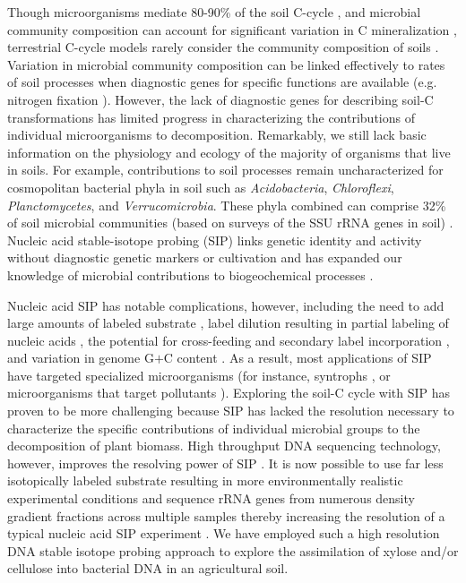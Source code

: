 Though microorganisms mediate 80-90\% of the soil C-cycle
\citep{ColemanCrossley_1996,Nannipieri_2003}, and microbial community
composition can account for significant variation in C mineralization
\citep{Strickland_2009}, terrestrial C-cycle models rarely consider the
community composition of soils \citep{Zak2006,Reed2007}. Variation in microbial
community composition can be linked effectively to rates of soil processes when
diagnostic genes for specific functions are available (e.g. nitrogen fixation
\citep{Hsu2009}).  However, the lack of diagnostic genes for describing soil-C
transformations has limited progress in characterizing the contributions of
individual microorganisms to decomposition. Remarkably, we still lack basic
information on the physiology and ecology of the majority of organisms that
live in soils. For example, contributions to soil processes remain
uncharacterized for cosmopolitan bacterial phyla in soil such as
\textit{Acidobacteria}, \textit{Chloroflexi}, \textit{Planctomycetes}, and
\textit{Verrucomicrobia}. These phyla combined can comprise 32\% of soil
microbial communities (based on surveys of the SSU rRNA genes in soil)
\citep{Janssen2006,Buckley2002}. Nucleic acid stable-isotope probing (SIP)
links genetic identity and activity without diagnostic genetic
markers or cultivation and has expanded our knowledge of microbial contributions to
biogeochemical processes \citep{Chen_Murrell_2010}. 

Nucleic acid SIP has notable complications, however, including the need to add
large amounts of labeled substrate \citep{radajewski2000stable}, label dilution
resulting in partial labeling of nucleic acids \citep{radajewski2000stable},
the potential for cross-feeding and secondary label incorporation
\citep{DeRito2005}, and variation in genome G$+$C content \citep{Buckley_2007}.
As a result, most applications of SIP have targeted specialized microorganisms
(for instance, syntrophs \citep{lueders2004}, or microorganisms that target pollutants
\citep{derito2005}). Exploring the soil-C cycle with SIP has proven to be more
challenging because SIP has lacked the resolution necessary to characterize the
specific contributions of individual microbial groups to the decomposition of
plant biomass. High throughput DNA sequencing technology, however, improves the
resolving power of SIP \citep{Aoyagi2015}. It is now possible to use far less
isotopically labeled substrate resulting in more environmentally realistic
experimental conditions and sequence rRNA genes from numerous density gradient
fractions across multiple samples thereby increasing the resolution of a
typical nucleic acid SIP experiment \citep{Verastegui_2014}.
We have employed such a high resolution DNA stable isotope probing approach to
explore the assimilation of xylose and/or cellulose into bacterial DNA in an
agricultural soil. 


